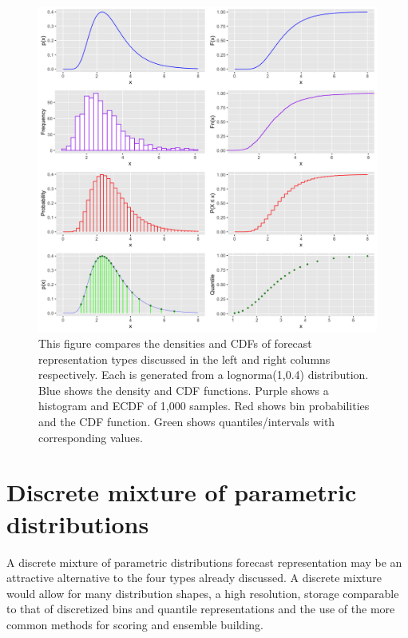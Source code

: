 \documentclass[11pt,notitlepage]{isuthesis}
\begin{document}
\begin{figure}[htbp]
\centerline{\includegraphics[scale=.1]{Images/dens_cum_comp.png}}
\caption[Density/CDF comparison between parametric distribution, sample 
distribution, discretized bin distribution and quantiles]{This figure compares 
the
densities and CDFs of forecast representation types discussed in the left and 
right columns respectively. Each is generated from a lognorma(1,0.4) 
distribution. Blue shows the density and CDF functions. Purple shows a 
histogram and ECDF of 1,000 samples. Red shows bin probabilities and the CDF
function. Green shows quantiles/intervals with corresponding values.}
\label{fig:denscomp}
\end{figure}




\section{Discrete mixture of parametric distributions}
A discrete mixture of parametric distributions forecast representation may be an
attractive alternative to the four types already discussed. A discrete mixture 
would allow for many distribution shapes, a high resolution, storage comparable
to that of discretized bins and quantile representations and the use of the more
common methods for scoring and ensemble building.
\end{document}
